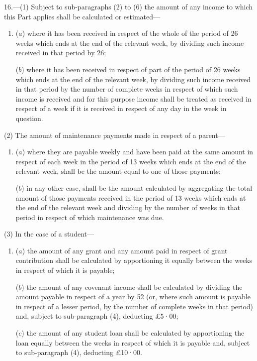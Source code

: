 \documentclass[12pt,a4paper]{article}
\begin{document}
16.—(1) Subject to sub-paragraphs (2) to (6) the amount of any income to which this Part applies shall be calculated or estimated—
\begin{enumerate}\item[]
($a$) where it has been received in respect of the whole of the period of 26 weeks which ends at the end of the relevant week, by dividing such income received in that period by 26;

($b$) where it has been received in respect of part of the period of 26 weeks which ends at the end of the relevant week, by dividing such income received in that period by the number of complete weeks in respect of which such income is received and for this purpose income shall be treated as received in respect of a week if it is received in respect of any day in the week in question.
\end{enumerate}

(2) The amount of maintenance payments made in respect of a parent—
\begin{enumerate}\item[]
($a$) where they are payable weekly and have been paid at the same amount in respect of each week in the period of 13 weeks which ends at the end of the relevant week, shall be the amount equal to one of those payments;

($b$) in any other case, shall be the amount calculated by aggregating the total amount of those payments received in the period of 13 weeks which ends at the end of the relevant week and dividing by the number of weeks in that period in respect of which maintenance was due.
\end{enumerate}

(3) In the case of a student—
\begin{enumerate}\item[]
($a$) the amount of any grant and any amount paid in respect of grant contribution shall be calculated by apportioning it equally between the weeks in respect of which it is payable;

($b$) the amount of any covenant income shall be calculated by dividing the amount payable in respect of a year by 52 (or, where such amount is payable in respect of a lesser period, by the number of complete weeks in that period) and, subject to sub-paragraph (4), deducting £5·00;

($c$) the amount of any student loan shall be calculated by apportioning the loan equally between the weeks in respect of which it is payable and, subject to sub-paragraph (4), deducting £10·00.
\end{enumerate}
\end{document}
